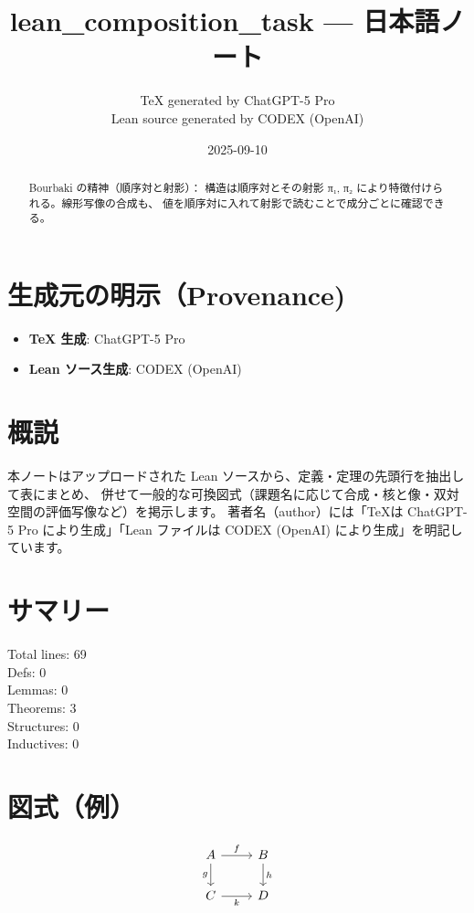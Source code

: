 \documentclass[12pt]{article}
\title{lean\_composition\_task — 日本語ノート}
\author{TeX generated by ChatGPT-5 Pro\\Lean source generated by CODEX (OpenAI)}
\date{2025-09-10}
\begin{document}
\maketitle

\begin{abstract}
Bourbaki の精神（順序対と射影）：
  構造は順序対とその射影 π₁, π₂ により特徴付けられる。線形写像の合成も、
  値を順序対に入れて射影で読むことで成分ごとに確認できる。
\end{abstract}

\section*{生成元の明示（Provenance)}
\begin{itemize}
  \item \textbf{TeX 生成}: ChatGPT-5 Pro
  \item \textbf{Lean ソース生成}: CODEX (OpenAI)
\end{itemize}

\section*{概説}
本ノートはアップロードされた Lean ソースから、定義・定理の先頭行を抽出して表にまとめ、
併せて一般的な可換図式（課題名に応じて合成・核と像・双対空間の評価写像など）を掲示します。
著者名（author）には「TeXは ChatGPT-5 Pro により生成」「Lean ファイルは CODEX (OpenAI) により生成」を明記しています。

\section*{サマリー}
Total lines: 69\\
Defs: 0\\
Lemmas: 0\\
Theorems: 3\\
Structures: 0\\
Inductives: 0

\section*{図式（例）}

\[
\begin{tikzcd}
A \arrow[r, "f"] \arrow[d, "g"'] & B \arrow[d, "h"] \\
C \arrow[r, "k"'] & D
\end{tikzcd}
\]
\end{document}

